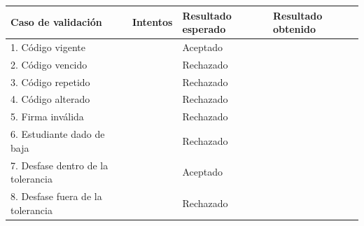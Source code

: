 \medskip
\noindent
{\small
	\begin{tabular}{|p{6cm}|p{2cm}|p{2.6cm}|p{3.6cm}|}
		\hline
		\textbf{Caso de validación} & \textbf{Intentos} & \textbf{Resultado esperado} & \textbf{Resultado obtenido} \\
		\hline
		1. Código vigente           &                   & Aceptado                    &                             \\ \hline
		2. Código vencido           &                   & Rechazado                   &                             \\ \hline
		3. Código repetido          &                   & Rechazado                   &                             \\ \hline
		4. Código alterado          &                   & Rechazado                   &                             \\ \hline
		5. Firma inválida           &                   & Rechazado                   &                             \\ \hline
		6. Estudiante dado de baja  &                   & Rechazado                   &                             \\ \hline
		7. Desfase dentro de la tolerancia & & Aceptado &                             \\ \hline
		8. Desfase fuera de la tolerancia  & & Rechazado &                            \\ \hline
	\end{tabular}}
